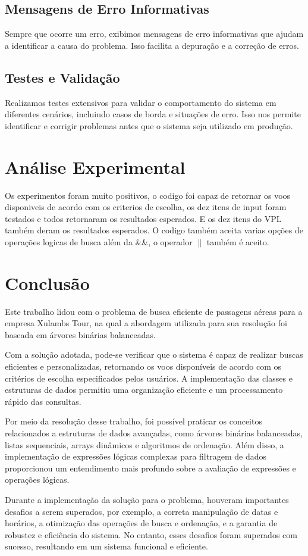 \documentclass[a4paper,12pt]{article}
\begin{document}
\subsection{Mensagens de Erro Informativas}
Sempre que ocorre um erro, exibimos mensagens de erro informativas que ajudam a identificar a causa do problema. Isso facilita a depuração e a correção de erros.

\subsection{Testes e Validação}
Realizamos testes extensivos para validar o comportamento do sistema em diferentes cenários, incluindo casos de borda e situações de erro. Isso nos permite identificar e corrigir problemas antes que o sistema seja utilizado em produção.

\section{Análise Experimental}\hspace*{1cm}
Os experimentos foram muito positivos, o codigo foi capaz de retornar os voos disponiveis de acordo com os criterios de escolha,
os dez itens de input foram testados e todos retornaram os resultados esperados. E os dez itens do VPL também deram os resultados esperados.
O codigo também aceita varias opções de operações logicas de busca além da \&\&, o operador \( \|  \) também é aceito.

\section{Conclusão}\hspace*{1cm}
Este trabalho lidou com o problema de busca eficiente de passagens aéreas para a empresa Xulambs Tour, na qual a abordagem utilizada para sua resolução foi baseada em árvores binárias balanceadas. 

Com a solução adotada, pode-se verificar que o sistema é capaz de realizar buscas eficientes e personalizadas, retornando os voos disponíveis de acordo com os critérios de escolha especificados pelos usuários. A implementação das classes e estruturas de dados permitiu uma organização eficiente e um processamento rápido das consultas.

Por meio da resolução desse trabalho, foi possível praticar os conceitos relacionados a estruturas de dados avançadas, como árvores binárias balanceadas, listas sequenciais, arrays dinâmicos e algoritmos de ordenação. Além disso, a implementação de expressões lógicas complexas para filtragem de dados proporcionou um entendimento mais profundo sobre a avaliação de expressões e operações lógicas.

Durante a implementação da solução para o problema, houveram importantes desafios a serem superados, por exemplo, a correta manipulação de datas e horários, a otimização das operações de busca e ordenação, e a garantia de robustez e eficiência do sistema. No entanto, esses desafios foram superados com sucesso, resultando em um sistema funcional e eficiente.
\end{document}
